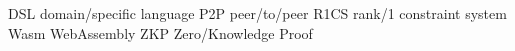   {DSL}  {domain\-/specific language}
  {P2P}  {peer\-/to\-/peer}
 {R1CS} {rank\-/1 constraint system}
 {Wasm} {WebAssembly}
  {ZKP}  {Zero\-/Knowledge Proof}

\endinput
